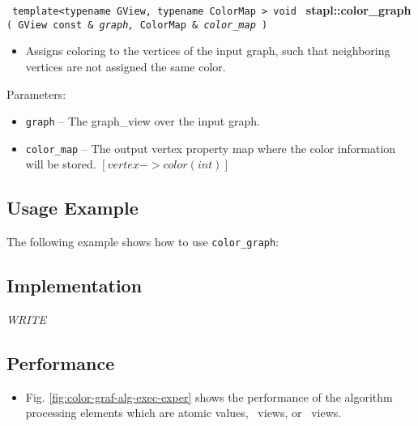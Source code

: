 
\noindent
\texttt{%
template<typename GView, typename ColorMap >
\newline
void 
}
\textbf{stapl::color\_graph}%
\newline
\texttt{%
(
GView const \&
\textit{graph,}%
ColorMap \&
\textit{color\_map}%
)     
}
\vspace{0.4cm}

\begin{itemize}
\item
Assigns coloring to the vertices of the input graph, such that neighboring vertices are not assigned the same color.
\end{itemize}

Parameters:
\begin{itemize}
\item
\texttt{graph} --
The graph\_view over the input graph.
\item
\texttt{color\_map} --
The output vertex property map where the color information will be stored. 
$[vertex->color (int)]$
\end{itemize}

\subsection{Usage Example} \label{sec-color-graf-alg-use}

The following example shows how to use 
\texttt{color\_graph}:


\subsection{Implementation} \label{sec-color-graf-alg-impl}

\textit{WRITE}

\subsection{Performance} \label{sec-color-graf-alg-perf}

\begin{itemize}
\item
Fig. \ref{fig:color-graf-alg-exec-exper}
shows the performance of the algorithm processing
elements which are atomic values, \stl\ views, or \stapl\ views.
\end{itemize}

